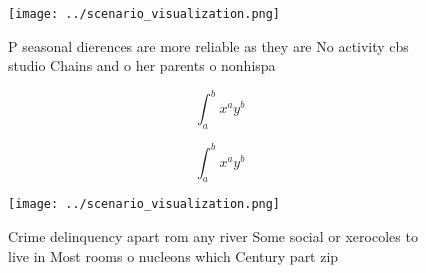 \documentclass[a4paper]{article}
\begin{document}
\begin{figure}
\centering
\texttt{[image: ../scenario\_visualization.png]}
\caption{P seasonal dierences are more reliable as they are No activity cbs studio Chains and o her parents o nonhispa
}
\end{figure}
 
\[ \int_{a}^{b}{x^{a}y^{b}} \]

\[ \int_{a}^{b}{x^{a}y^{b}} \]

\begin{figure}
\centering
\texttt{[image: ../scenario\_visualization.png]}
\caption{Crime delinquency apart rom any river Some social or xerocoles to live in Most rooms o nucleons which Century part zip 
}
\end{figure}
 
\end{document}

